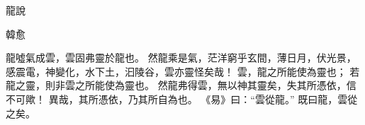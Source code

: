 龍說

韓愈

龍噓氣成雲，雲固弗靈於龍也。
然龍乘是氣，茫洋窮乎玄間，薄日月，伏光景，感震電，神變化，水下土，汩陵谷，雲亦靈怪矣哉！
雲，龍之所能使為靈也；
若龍之靈，則非雲之所能使為靈也。
然龍弗得雲，無以神其靈矣，失其所憑依，信不可歟！
異哉，其所憑依，乃其所自為也。
《易》曰：“雲從龍。”
既曰龍，雲從之矣。